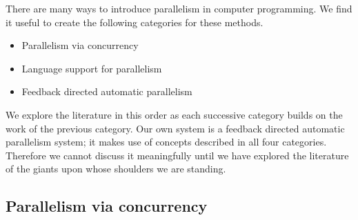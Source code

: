 There are many ways to introduce parallelism in computer programming.
We find it useful to create the following categories for these methods.
\begin{itemize}
    \item Parallelism via concurrency

    \item Language support for parallelism


    \item Feedback directed automatic parallelism

\end{itemize}
We explore the literature in this order as each successive category builds
on the work of the previous category.
Our own system is a feedback directed automatic parallelism system;
it makes use of concepts described in all four categories.
Therefore
we cannot discuss it meaningfully until we have explored the literature
of the giants upon whose shoulders we are standing.


\subsection{Parallelism via concurrency}
\label{sec:intro_concurrency}


